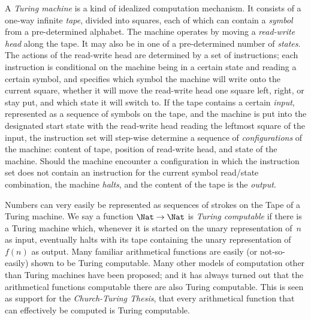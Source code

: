 A \emph{Turing machine} is a kind of idealized computation
mechanism. It consists of a one-way infinite \emph{tape}, divided into
squares, each of which can contain a \emph{symbol} from a
pre-determined alphabet. The machine operates by moving a
\emph{read-write head} along the tape. It may also be in one of a
pre-determined number of \emph{states}. The actions of the read-write
head are determined by a set of instructions; each instruction is
conditional on the machine being in a certain state and reading a
certain symbol, and specifies which symbol the machine will write onto
the current square, whether it will move the read-write head one
square left, right, or stay put, and which state it will switch to.
If the tape contains a certain \emph{input}, represented as a sequence
of symbols on the tape, and the machine is put into the designated
start state with the read-write head reading the leftmost square of
the input, the instruction set will step-wise determine a sequence of
\emph{configurations} of the machine: content of tape, position of
read-write head, and state of the machine. Should the machine
encounter a configuration in which the instruction set does not
contain an instruction for the current symbol read/state combination,
the machine \emph{halts}, and the content of the tape is the
\emph{output}.

Numbers can very easily be represented as sequences of strokes on the
Tape of a Turing machine. We say a function $\Nat \to \Nat$ is
\emph{Turing computable} if there is a Turing machine which, whenever
it is started on the unary representation of~$n$ as input, eventually
halts with its tape containing the unary representation of~$f(n)$ as
output. Many familiar arithmetical functions are easily (or
not-so-easily) shown to be Turing computable. Many other models of
computation other than Turing machines have been proposed; and it has
always turned out that the arithmetical functions computable there are
also Turing computable. This is seen as support for the
\emph{Church-Turing Thesis}, that every arithmetical function that can
effectively be computed is Turing computable.
